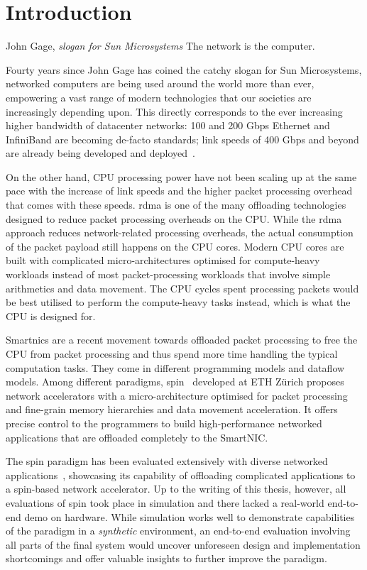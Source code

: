 \chapter{Introduction}
\begin{chapquote}{John Gage, \textit{slogan for Sun Microsystems}}
The network is the computer.
\end{chapquote}

Fourty years since John Gage has coined the catchy slogan for Sun Microsystems, networked computers are being used around the world more than ever, empowering a vast range of modern technologies that our societies are increasingly depending upon.  This directly corresponds to the ever increasing higher bandwidth of datacenter networks: 100 and 200 Gbps Ethernet and InfiniBand are becoming de-facto standards; link speeds of 400 Gbps and beyond are already being developed and deployed~\cite{miller_pursuit_nodate}.

On the other hand, CPU processing power have not been scaling up at the same pace with the increase of link speeds and the higher packet processing overhead that comes with these speeds.  \ac{rdma} is one of the many offloading technologies designed to reduce packet processing overheads on the CPU.  While the \ac{rdma} approach reduces network-related processing overheads, the actual consumption of the packet payload still happens on the CPU cores.  Modern CPU cores are built with complicated micro-architectures optimised for compute-heavy workloads instead of most packet-processing workloads that involve simple arithmetics and data movement.  The CPU cycles spent processing packets would be best utilised to perform the compute-heavy tasks instead, which is what the CPU is designed for.

Smart\acs{nic}s are a recent movement towards offloaded packet processing to free the CPU from packet processing and thus spend more time handling the typical computation tasks.  They come in different programming models and dataflow models.  Among different paradigms, \ac{spin}~\cite{hoefler_spin_2017} developed at ETH Z\"urich proposes network accelerators with a micro-architecture optimised for packet processing and fine-grain memory hierarchies and data movement acceleration.  It offers precise control to the programmers to build high-performance networked applications that are offloaded completely to the SmartNIC.

The \ac{spin} paradigm has been evaluated extensively with diverse networked applications~\cite{di_girolamo_network-accelerated_2019, cao_accelerating_2022, di_girolamo_building_2022}, showcasing its capability of offloading complicated applications to a \ac{spin}-based network accelerator.  Up to the writing of this thesis, however, all evaluations of \ac{spin} took place in simulation and there lacked a real-world end-to-end demo on hardware.  While simulation works well to demonstrate capabilities of the paradigm in a \emph{synthetic} environment, an end-to-end evaluation involving all parts of the final system would uncover unforeseen design and implementation shortcomings and offer valuable insights to further improve the paradigm.

